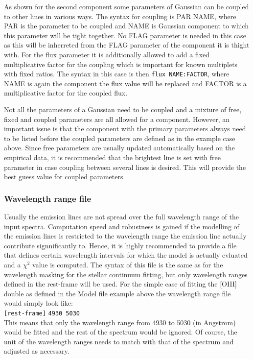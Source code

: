 \documentclass[usenatbib,usegraphicx,useAMS,onecolumn]{mn2e}
\newcommand{\codeline}[1]{\lstinline|#1|}
\begin{document}
As shown for the second component some parameters of Gaussian can be coupled to other lines in various ways. The syntax for coupling is PAR NAME, where PAR is the parameter to be coupled and NAME is Gaussian component to which this parameter will be tight together. No FLAG parameter is needed in this case as this will be inherreted from the FLAG parameter of the component it is thight with. For the flux parameter it is additionally allowed to add a fixed multiplicative factor for the coupling which is important for known multiplets with fixed ratios. The syntax in this case is then \codeline{flux NAME:FACTOR}, where NAME is again the component the flux value will be replaced and FACTOR is a multiplicative factor for the coupled flux. 

Not all the parameters of a Gaussian need to be coupled and a mixture of free, fixed and coupled parameters are all allowed for a component. However, an important issue is that the component with the primary parameters always need to be listed before the coupled parameters are defined as in the example case above. Since free parameters are usually updated automatically based on the empirical data, it is recommended that the brightest line is set with free parameter in case coupling between several lines is desired. This will provide the best guess value for coupled parameters.

\subsubsection{Wavelength range file}\label{subsec:wavelength_range}
Usually the emission lines are not spread over the full wavelength range of the input spectra. Computation speed and robustness is gained if the modelling of the emission lines is restricted to the wavelength range the emission line actually contribute signnificantly to. Hence, it is highly recommended to provide a file that defines certain wavelength intervals for which the model is actually evluated and a $\chi^2$ value is computed. The syntax of this file is the same as for the wavelength masking for the stellar continuum fitting, but only wavelength ranges defined in the rest-frame will be used. For the simple case of fitting the [OIII] double as defined in the Model file example above the wavelength range file would simply look like:\bigskip\\
\codeline{[rest-frame]}
\codeline{4930 5030}\bigskip\\

This means that only the wavelength range from 4930 to 5030 (in Angstrom) would be fitted and the rest of the spectrum would be ignored. Of course, the unit of the wavelength ranges needs to match with that of the spectrum and adjusted as necessary.
\end{document}
